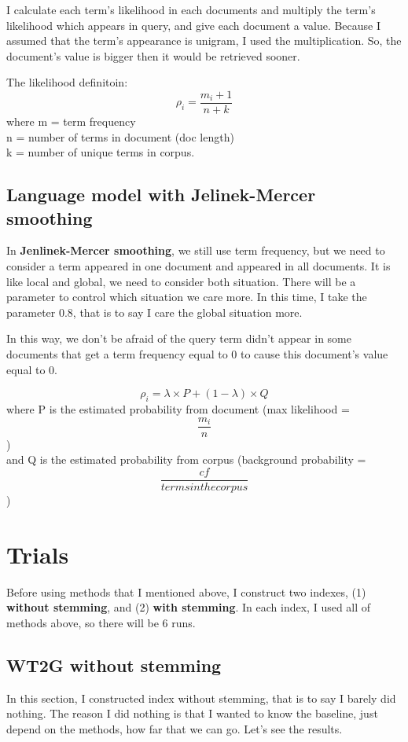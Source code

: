 \documentclass[a4pper,11pt,onecolumn]{article}
\begin{document}
I calculate each term's likelihood in each documents and multiply the term's likelihood which appears in query, and give each document a value. Because I assumed that the term's appearance is unigram, I used the multiplication. So, the document's value is bigger then it would be retrieved sooner.

The likelihood definitoin:
\[
    \rho_i = \frac{m_i + 1}{n + k}
\]
where m = term frequency\\
n = number of terms in document (doc length)\\
k = number of unique terms in corpus.

\subsection{Language model with Jelinek-Mercer smoothing}
In \textbf{Jenlinek-Mercer smoothing}, we still use term frequency, but we  need to consider a term appeared in one document and appeared in all documents. It is like local and global, we need to consider both situation. There will be a parameter to control which situation we care more. In this time, I take the parameter 0.8, that is to say I care the global situation more.

In this way, we don't be afraid of the query term didn't appear in some documents that get a term frequency equal to 0 to cause this document's value equal to 0.

\[
    \rho_i = \lambda \times P + (1 - \lambda) \times Q
\]
where P is the estimated probability from document (max likelihood = \[ \frac{m_i}{n}\])\\
and Q is the estimated probability from corpus (background probability = \[ \frac{cf}{terms in the corpus} \])

\section{Trials}
Before using methods that I mentioned above, I construct two indexes, (1) \textbf{without stemming}, and (2) \textbf{with stemming}. In each index, I used all of methods above, so there will be 6 runs.

\subsection{WT2G without stemming}
In this section, I constructed index without stemming, that is to say I barely did nothing. The reason I did nothing is that I wanted to know the baseline, just depend on the methods, how far that we can go.
Let's see the results.
\end{document}

